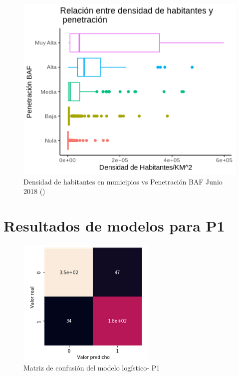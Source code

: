 \documentclass[9pt,twocolumn,twoside]{ilcss}
\begin{document}
\begin{appendices}
\begin{figure}[tbhp]
	\centering
	\includegraphics[width=1.0\linewidth]{images/pen_denhabs.png}
	\caption{Densidad de habitantes en municipios vs Penetración BAF Junio 2018 (\cite{IFT2019BIT})}
	\label{fig:pen_denhabs}
\end{figure}
\newpage
\section{Resultados de modelos para P1}

\begin{figure}[tbhp]
	\centering
	\includegraphics[width=0.6\linewidth]{images/p1_mc_logistic.png}
	\caption{Matriz de confusión del modelo logístico- P1 }
	\label{fig:p1_mc_logistic}
\end{figure}


\end{appendices}
\end{document}
